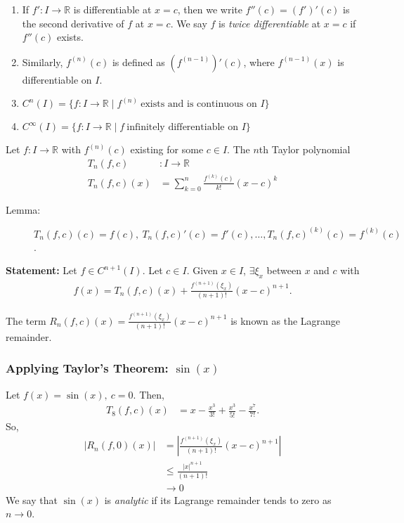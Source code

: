 \documentclass[10pt]{extarticle}
\newcommand{\R}{\mathbb{R}}
\begin{document}
  \begin{enumerate}[(1)]
    \item If $f': I\rightarrow\R$ is differentiable at $x=c$, then we write $f''(c) = (f')'(c)$ is the second derivative of $f$ at $x=c$. We say $f$ is \textit{twice differentiable} at $x=c$ if $f''(c)$ exists.
    \item Similarly, $f^{(n)}(c)$ is defined as $(f^{(n-1)})'(c)$, where $f^{(n-1)}(x)$ is differentiable on $I$.
    \item $\displaystyle C^{n}(I) = \{f: I\rightarrow\R\mid f^{(n)}~\text{exists and is continuous on $I$}\}$
    \item $\displaystyle C^{\infty}(I) = \{f: I\rightarrow\R \mid f~\text{infinitely differentiable on $I$}\}$
  \end{enumerate}
  Let $f: I\rightarrow \R$ with $f^{(n)}(c)$ existing for some $c\in I$. The $n$th Taylor polynomial
  \begin{align*}
    T_n(f,c)&: I\rightarrow \R\\
    T_n(f,c)(x) &= \sum_{k=0}^{n}\frac{f^{(k)}(c)}{k!}(x-c)^k
  \end{align*}
  \begin{description}
    \item[Lemma:] $T_n(f,c)(c) = f(c),~T_n(f,c)'(c) = f'(c),\dots,T_n(f,c)^{(k)}(c) = f^{(k)}(c)$.
  \end{description}
  \textbf{Statement:} Let $f\in C^{n+1}(I)$. Let $c\in I$. Given $x\in I$, $\exists \xi_x$ between $x$ and $c$ with
  \begin{align*}
    f(x) = T_n(f,c)(x) + \frac{f^{(n+1)}(\xi_x)}{(n+1)!}(x-c)^{n+1}.
  \end{align*}
  \begin{description}
    \small
    \item[Remark:] The term $R_n(f,c)(x) = \frac{f^{(n+1)}(\xi_x)}{(n+1)!}(x-c)^{n+1}$ is known as the Lagrange remainder.
  \end{description}
  \subsubsection{Applying Taylor's Theorem: $\sin(x)$}%
  Let $f(x) = \sin(x),~c=0$. Then,
  \begin{align*}
    T_8(f,c)(x) &= x-\frac{x^3}{3!} + \frac{x^3}{5!} - \frac{x^7}{7!}.
  \end{align*}
  So,
  \begin{align*}
    |R_n(f,0)(x)| &= \left|\frac{f^{(n+1)}(\xi_x)}{(n+1)!}(x-c)^{n+1}\right|\\
                  &\leq \frac{|x|^{n+1}}{(n+1)!}\\
                  &\rightarrow 0
  \end{align*}
  We say that $\sin(x)$ is \textit{analytic} if its Lagrange remainder tends to zero as $n\rightarrow 0$.
\end{document}
